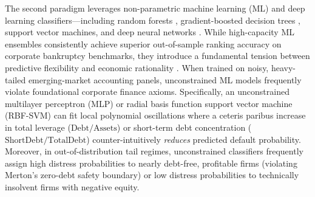 \documentclass[pdflatex,sn-mathphys-num,twocolumn]{sn-jnl}
\theoremstyle{thmstyleone}
\theoremstyle{thmstyletwo}
\theoremstyle{thmstylethree}
\begin{document}
The second paradigm leverages non-parametric machine learning (ML) and deep learning classifiers---including random forests \citep{breiman2001random}, gradient-boosted decision trees \citep{chen2016xgboost,ke2017lightgbm,prokhorenkova2018catboost}, support vector machines, and deep neural networks \citep{lessmann2015benchmarking,zieba2016ensemble,barboza2017machine,mai2019deep,hosaka2019bankruptcy,gunnarsson2021deep}. While high-capacity ML ensembles consistently achieve superior out-of-sample ranking accuracy on corporate bankruptcy benchmarks, they introduce a fundamental tension between predictive flexibility and economic rationality \citep{bussmann2021explainable,bucker2022transparency,dumitrescu2022machine}. When trained on noisy, heavy-tailed emerging-market accounting panels, unconstrained ML models frequently violate foundational corporate finance axioms. Specifically, an unconstrained multilayer perceptron (MLP) or radial basis function support vector machine (RBF-SVM) can fit local polynomial oscillations where a ceteris paribus increase in total leverage ($\text{Debt}/\text{Assets}$) or short-term debt concentration ($\text{ShortDebt}/\text{TotalDebt}$) counter-intuitively \textit{reduces} predicted default probability. Moreover, in out-of-distribution tail regimes, unconstrained classifiers frequently assign high distress probabilities to nearly debt-free, profitable firms (violating Merton's zero-debt safety boundary) or low distress probabilities to technically insolvent firms with negative equity.
\end{document}
